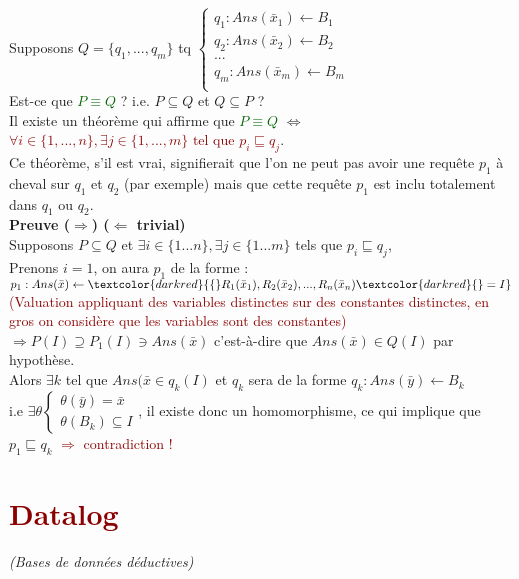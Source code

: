 \documentclass{article}
\newcommand{\gre}[1]{\textcolor{darkgreen}{#1}}
\newcommand{\red}[1]{\textcolor{darkred}{#1}}
\begin{document}
Supposons $Q = \{q_1,...,q_m\}$ tq $\left\{ \begin{array}{l}
q_1 : Ans(\bar{x}_1) \leftarrow B_1 \\
q_2 : Ans(\bar{x}_2) \leftarrow B_2 \\
... \\
q_m : Ans(\bar{x}_m) \leftarrow B_m \\
\end{array}\right.$ \\
Est-ce que \gre{$P\equiv Q$} ? i.e. $P\subseteq Q$ et $Q\subseteq P$ ?  \\
Il existe un théorème qui affirme que \gre{$P\equiv Q$}  $\Leftrightarrow$\red{$\forall i \in \{1,...,n\}, \exists j \in \{1,...,m\} \text{ tel que } p_i \sqsubseteq q_j$}. \\
Ce théorème, s'il est vrai, signifierait que l'on ne peut pas avoir une requête $p_1$ à cheval sur $q_1$ et $q_2$ (par exemple) mais que cette requête $p_1$ est inclu totalement 
dans $q_1$ ou $q_2$. \\
\textbf{Preuve ($\Rightarrow$) ($\Leftarrow$ trivial)}  \\
Supposons $P\subseteq Q$ et $\exists i \in \{1...n\}, \exists j \in \{1...m\}$ tels que $p_i \sqsubseteq q_j$,\\
Prenons $i=1$, on aura $p_1$ de la forme : $p_1:Ans(\bar{x}) \leftarrow \red{\{} R_1(\bar{x}_1), R_2(\bar{x}_2), ..., R_n(\bar{x}_n)\red{\} = I}$ \red{(Valuation 
appliquant des variables distinctes sur des constantes distinctes, en gros on considère que les variables sont des constantes)} \\
$ $ \\
$ $ \\
$\Rightarrow P(I) \supseteq P_1(I) \ni Ans(\bar{x})$ c'est-à-dire que $Ans(\bar{x}) \in Q(I)$ par hypothèse. \\
Alors $\exists k$ tel que $Ans(\bar{x} \in q_k(I)$ et $q_k$ sera de la forme $q_k : Ans(\bar{y}) \leftarrow B_k$ \\
i.e $\exists \theta \left\{\begin{array}{l}
	\theta(\bar{y}) = \bar{x} \\
	\theta(B_k)  \subseteq  I
	\end{array}\right.$, il existe donc un homomorphisme, ce qui implique que $p_1 \sqsubseteq q_k$ \red{$\Rightarrow$ contradiction !}

\section{\red{Datalog}}
\textit{(Bases de données déductives)} \\
\end{document}
